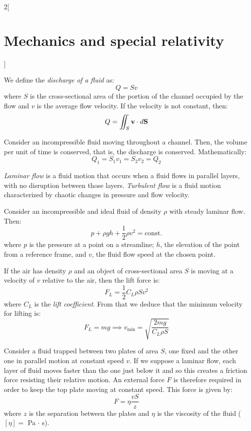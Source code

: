 \documentclass[../../../main.tex]{subfiles}
\begin{document}
\begin{multicols}{2}[\section{Mechanics and special relativity}]
\begin{prop}
    \end{prop}
    \begin{definition}
        We define the \textit{discharge of a fluid} as: $$Q=Sv$$ where $S$ is the cross-sectional area of the portion of the channel occupied by the flow and $v$ is the average flow velocity. If the velocity is not constant, then: $$Q=\iint_S\boldsymbol{\mathrm{v}}\cdot d\boldsymbol{\mathrm{S}}$$
    \end{definition}
    \begin{prop}
        Consider an incompressible fluid moving throughout a channel. Then, the volume per unit of time is conserved, that is, the discharge is conserved. Mathematically: $$Q_1=S_1v_1=S_2v_2=Q_2$$
    \end{prop}
    \begin{definition}
        \textit{Laminar flow} is a fluid motion that occurs when a fluid flows in parallel layers, with no disruption between those layers. \textit{Turbulent flow} is a fluid motion characterized by chaotic changes in pressure and flow velocity.
    \end{definition}
    \begin{center}
        \begin{minipage}{\linewidth}
            \centering
            
        \end{minipage}
    \end{center}
    \begin{prop}
        Consider an incompressible and ideal fluid of density $\rho$ with steady laminar flow. Then: $$p+\rho gh+\frac{1}{2}\rho v^2=\text{const.}$$ where $p$ is the pressure at a point on a streamline; $h$, the elevation of the point from a reference frame, and $v$, the fluid flow speed at the chosen point.
    \end{prop}
    \begin{prop}
        If the air has density $\rho$ and an object of cross-sectional area $S$ is moving at a velocity of $v$ relative to the air, then the lift force is: $$F_L=\frac{1}{2}C_L\rho Sv^2$$ where $C_L$ is the \textit{lift coefficient}. From that we deduce that the minimum velocity for lifting is: $$F_L=mg\implies v_\text{min}=\sqrt{\frac{2mg}{C_L\rho S}}$$
    \end{prop}
    \begin{prop}[Viscosity]
        Consider a fluid trapped between two plates of area $S$, one fixed and the other one in parallel motion at constant speed $v$. If we suppose a laminar flow, each layer of fluid moves faster than the one just below it and so this creates a friction force  resisting their relative motion. An external force $F$ is therefore required in order to keep the top plate moving at constant speed. This force is given by: $$F=\eta\frac{vS}{z}$$ where $z$ is the separation between the plates and $\eta$ is the viscosity of the fluid ($[\eta]=$ Pa $\cdot$ s).

\end{prop}
\end{multicols}
\end{document}
